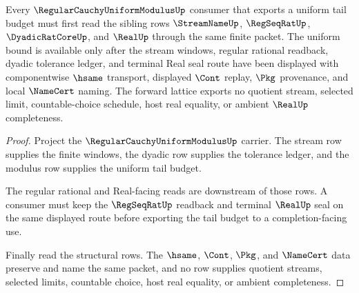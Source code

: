 \begin{theorem}
\label{thm:regular-cauchy-uniform-modulus-regseqrat-real-forward-lattice}
Every $\RegularCauchyUniformModulusUp$ consumer that exports a uniform tail budget must first read the sibling rows $\StreamNameUp$, $\RegSeqRatUp$, $\DyadicRatCoreUp$, and $\RealUp$ through the same finite packet. The uniform bound is available only after the stream windows, regular rational readback, dyadic tolerance ledger, and terminal Real seal route have been displayed with componentwise $\hsame$ transport, displayed $\Cont$ replay, $\Pkg$ provenance, and local $\NameCert$ naming. The forward lattice exports no quotient stream, selected limit, countable-choice schedule, host real equality, or ambient $\RealUp$ completeness.
\end{theorem}
\begin{proof}
Project the $\RegularCauchyUniformModulusUp$ carrier. The stream row supplies the finite windows, the dyadic row supplies the tolerance ledger, and the modulus row supplies the uniform tail budget.

The regular rational and Real-facing reads are downstream of those rows. A consumer must keep the $\RegSeqRatUp$ readback and terminal $\RealUp$ seal on the same displayed route before exporting the tail budget to a completion-facing use.

Finally read the structural rows. The $\hsame$, $\Cont$, $\Pkg$, and $\NameCert$ data preserve and name the same packet, and no row supplies quotient streams, selected limits, countable choice, host real equality, or ambient completeness.
\end{proof}
